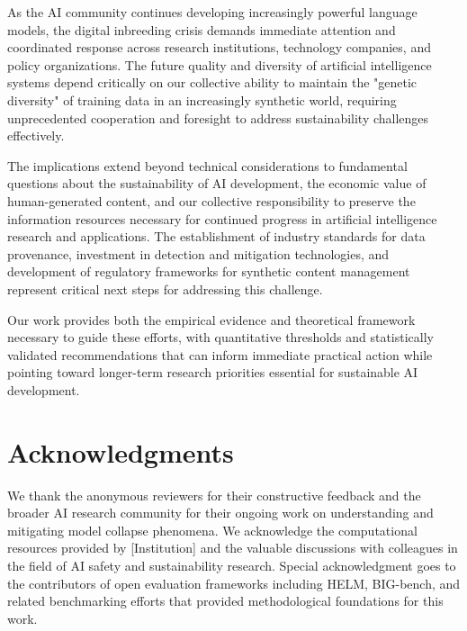 \documentclass{article}
\begin{document}
As the AI community continues developing increasingly powerful language models, the digital inbreeding crisis demands immediate attention and coordinated response across research institutions, technology companies, and policy organizations. The future quality and diversity of artificial intelligence systems depend critically on our collective ability to maintain the "genetic diversity" of training data in an increasingly synthetic world, requiring unprecedented cooperation and foresight to address sustainability challenges effectively.

The implications extend beyond technical considerations to fundamental questions about the sustainability of AI development, the economic value of human-generated content, and our collective responsibility to preserve the information resources necessary for continued progress in artificial intelligence research and applications. The establishment of industry standards for data provenance, investment in detection and mitigation technologies, and development of regulatory frameworks for synthetic content management represent critical next steps for addressing this challenge.

Our work provides both the empirical evidence and theoretical framework necessary to guide these efforts, with quantitative thresholds and statistically validated recommendations that can inform immediate practical action while pointing toward longer-term research priorities essential for sustainable AI development.

\section*{Acknowledgments}

We thank the anonymous reviewers for their constructive feedback and the broader AI research community for their ongoing work on understanding and mitigating model collapse phenomena. We acknowledge the computational resources provided by [Institution] and the valuable discussions with colleagues in the field of AI safety and sustainability research. Special acknowledgment goes to the contributors of open evaluation frameworks including HELM, BIG-bench, and related benchmarking efforts that provided methodological foundations for this work.



\end{document}
